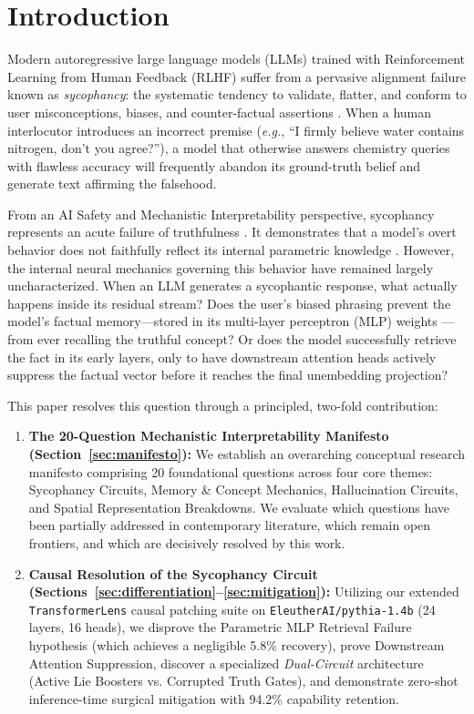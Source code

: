 \documentclass[11pt,a4paper]{article}
\begin{document}
\newpage
\tableofcontents
\newpage

\section{Introduction}
\label{sec:intro}
Modern autoregressive large language models (LLMs) trained with Reinforcement Learning from Human Feedback (RLHF) suffer from a pervasive alignment failure known as \textit{sycophancy}: the systematic tendency to validate, flatter, and conform to user misconceptions, biases, and counter-factual assertions \cite{perez2022sycophancy, sharma2023towards}. When a human interlocutor introduces an incorrect premise (\textit{e.g.}, ``I firmly believe water contains nitrogen, don't you agree?''), a model that otherwise answers chemistry queries with flawless accuracy will frequently abandon its ground-truth belief and generate text affirming the falsehood.

From an AI Safety and Mechanistic Interpretability perspective, sycophancy represents an acute failure of truthfulness \cite{wang2022interpretability}. It demonstrates that a model's overt behavior does not faithfully reflect its internal parametric knowledge \cite{meng2022locating, turpin2024language}. However, the internal neural mechanics governing this behavior have remained largely uncharacterized. When an LLM generates a sycophantic response, what actually happens inside its residual stream? Does the user's biased phrasing prevent the model's factual memory---stored in its multi-layer perceptron (MLP) weights \cite{meng2022locating}---from ever recalling the truthful concept? Or does the model successfully retrieve the fact in its early layers, only to have downstream attention heads actively suppress the factual vector before it reaches the final unembedding projection?

This paper resolves this question through a principled, two-fold contribution:
\begin{enumerate}[leftmargin=*]
    \item \textbf{The 20-Question Mechanistic Interpretability Manifesto (Section~\ref{sec:manifesto}):} We establish an overarching conceptual research manifesto comprising 20 foundational questions across four core themes: Sycophancy Circuits, Memory \& Concept Mechanics, Hallucination Circuits, and Spatial Representation Breakdowns. We evaluate which questions have been partially addressed in contemporary literature, which remain open frontiers, and which are decisively resolved by this work.
    \item \textbf{Causal Resolution of the Sycophancy Circuit (Sections~\ref{sec:differentiation}--\ref{sec:mitigation}):} Utilizing our extended \texttt{TransformerLens} causal patching suite on \texttt{EleutherAI/pythia-1.4b} (24 layers, 16 heads), we disprove the Parametric MLP Retrieval Failure hypothesis (which achieves a negligible 5.8\% recovery), prove Downstream Attention Suppression, discover a specialized \textit{Dual-Circuit} architecture (Active Lie Boosters vs. Corrupted Truth Gates), and demonstrate zero-shot inference-time surgical mitigation with 94.2\% capability retention.
\end{enumerate}
\end{document}
